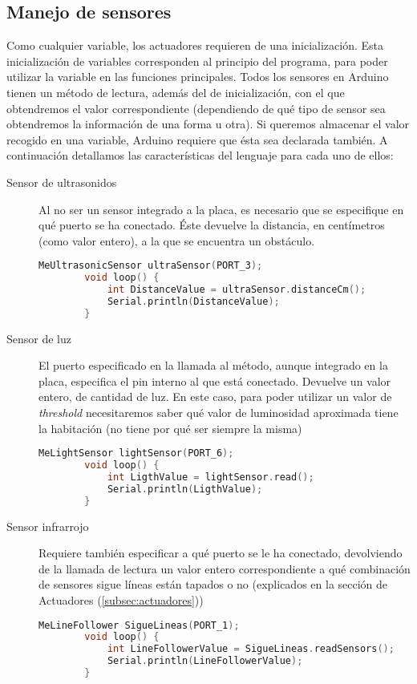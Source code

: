 \subsection{Manejo de sensores}\label{subsec:sensoresArduino}
Como cualquier variable, los actuadores requieren de una inicialización. Esta inicialización de variables corresponden al principio del programa, para poder utilizar la variable en las funciones principales. Todos los sensores en Arduino tienen un método de lectura, además del de inicialización, con el que obtendremos el valor correspondiente (dependiendo de qué tipo de sensor sea obtendremos la información de una forma u otra). Si queremos almacenar el valor recogido en una variable, Arduino requiere que ésta sea declarada también. A continuación detallamos las características del lenguaje para cada uno de ellos:
\begin{description}
	\item [Sensor de ultrasonidos] Al no ser un sensor integrado a la placa, es necesario que se especifique en qué puerto se ha conectado. Éste devuelve la distancia, en centímetros (como valor entero), a la que se encuentra un obstáculo.
	\begin{lstlisting}[language=C,caption={Sensor de distancia}]	
		MeUltrasonicSensor ultraSensor(PORT_3);
		void loop() {
			int DistanceValue = ultraSensor.distanceCm();
			Serial.println(DistanceValue);
		}
	\end{lstlisting}
	\item [Sensor de luz] El puerto especificado en la llamada al método, aunque integrado en la placa, especifica el pin interno al que está conectado. Devuelve un valor entero, de cantidad de luz. En este caso, para poder utilizar un valor de \textit{threshold} necesitaremos saber qué valor de luminosidad aproximada tiene la habitación (no tiene por qué ser siempre la misma)
	\begin{lstlisting}[language=C,caption={Sensor de luz}]	
		MeLightSensor lightSensor(PORT_6);
		void loop() {
			int LigthValue = lightSensor.read();
			Serial.println(LigthValue);
		}
	\end{lstlisting}
	\item [Sensor infrarrojo] Requiere también especificar a qué puerto se le ha conectado, devolviendo de la llamada de lectura un valor entero correspondiente a qué combinación de sensores sigue líneas están tapados o no (explicados en la sección de Actuadores (\ref{subsec:actuadores}))
	\begin{lstlisting}[language=C,caption={Sensor siguelíneas}]	
		MeLineFollower SigueLineas(PORT_1); 
		void loop() {
			int LineFollowerValue = SigueLineas.readSensors();
			Serial.println(LineFollowerValue);
		}
	\end{lstlisting}
\end{description}


